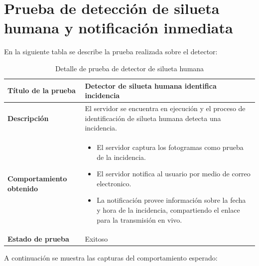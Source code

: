 \section{Prueba de detección de silueta humana y notificación inmediata}

En la siguiente tabla se describe la prueba realizada sobre el detector:

\begin{table}[H]
    \caption{Detalle de prueba de detector de silueta humana}
    \begin{center}
        \begin{tabular}{|>{\centering}p{}|m{}<{\centering}|} 
            \hline
            \textbf{Título de la prueba} & Detector de silueta humana identifica incidencia \\
            \hline
            \textbf{Descripción} & El servidor se encuentra en ejecución y el proceso de identificación de silueta humana detecta una incidencia.\\
            \hline
            \textbf{Comportamiento obtenido} & 
            \begin{itemize}
                \item El servidor captura los fotogramas como prueba de la incidencia.
                \item El servidor notifica al usuario por medio de correo electronico.
                \item La notificación provee información sobre la fecha y hora de la incidencia, compartiendo el enlace para la transmisión en vivo.
            \end{itemize} \\ 
            \hline
            \textbf{Estado de prueba} & Exitoso \\
            \hline
        \end{tabular}
    \end{center}
\end{table}

A continuación se muestra las capturas del comportamiento esperado:

